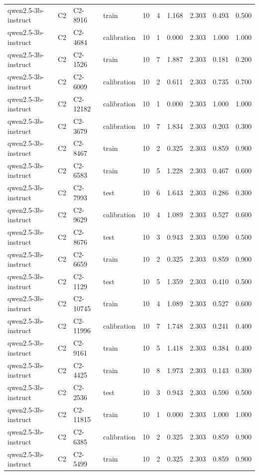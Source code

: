 \begin{table}
\begin{tabular}{llllrrrrrr}
qwen2.5-3b-instruct & C2 & C2-8916 & train & 10 & 4 & 1.168 & 2.303 & 0.493 & 0.500 \\
qwen2.5-3b-instruct & C2 & C2-4684 & calibration & 10 & 1 & 0.000 & 2.303 & 1.000 & 1.000 \\
qwen2.5-3b-instruct & C2 & C2-1526 & train & 10 & 7 & 1.887 & 2.303 & 0.181 & 0.200 \\
qwen2.5-3b-instruct & C2 & C2-6009 & calibration & 10 & 2 & 0.611 & 2.303 & 0.735 & 0.700 \\
qwen2.5-3b-instruct & C2 & C2-12182 & calibration & 10 & 1 & 0.000 & 2.303 & 1.000 & 1.000 \\
qwen2.5-3b-instruct & C2 & C2-3679 & calibration & 10 & 7 & 1.834 & 2.303 & 0.203 & 0.300 \\
qwen2.5-3b-instruct & C2 & C2-8467 & train & 10 & 2 & 0.325 & 2.303 & 0.859 & 0.900 \\
qwen2.5-3b-instruct & C2 & C2-6583 & train & 10 & 5 & 1.228 & 2.303 & 0.467 & 0.600 \\
qwen2.5-3b-instruct & C2 & C2-7993 & test & 10 & 6 & 1.643 & 2.303 & 0.286 & 0.300 \\
qwen2.5-3b-instruct & C2 & C2-9629 & calibration & 10 & 4 & 1.089 & 2.303 & 0.527 & 0.600 \\
qwen2.5-3b-instruct & C2 & C2-8676 & test & 10 & 3 & 0.943 & 2.303 & 0.590 & 0.500 \\
qwen2.5-3b-instruct & C2 & C2-6659 & train & 10 & 2 & 0.325 & 2.303 & 0.859 & 0.900 \\
qwen2.5-3b-instruct & C2 & C2-1129 & test & 10 & 5 & 1.359 & 2.303 & 0.410 & 0.500 \\
qwen2.5-3b-instruct & C2 & C2-10745 & train & 10 & 4 & 1.089 & 2.303 & 0.527 & 0.600 \\
qwen2.5-3b-instruct & C2 & C2-11996 & calibration & 10 & 7 & 1.748 & 2.303 & 0.241 & 0.400 \\
qwen2.5-3b-instruct & C2 & C2-9161 & train & 10 & 5 & 1.418 & 2.303 & 0.384 & 0.400 \\
qwen2.5-3b-instruct & C2 & C2-4425 & train & 10 & 8 & 1.973 & 2.303 & 0.143 & 0.300 \\
qwen2.5-3b-instruct & C2 & C2-2536 & test & 10 & 3 & 0.943 & 2.303 & 0.590 & 0.500 \\
qwen2.5-3b-instruct & C2 & C2-11815 & train & 10 & 1 & 0.000 & 2.303 & 1.000 & 1.000 \\
qwen2.5-3b-instruct & C2 & C2-6385 & calibration & 10 & 2 & 0.325 & 2.303 & 0.859 & 0.900 \\
qwen2.5-3b-instruct & C2 & C2-5499 & train & 10 & 2 & 0.325 & 2.303 & 0.859 & 0.900 \\

\end{tabular}
\end{table}
